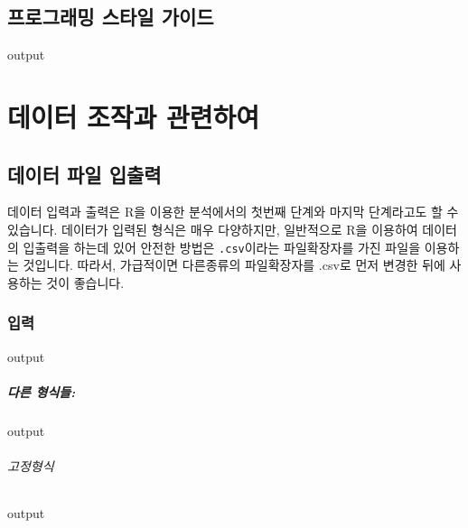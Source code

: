 \documentclass{book}
\begin{document}
	
\section{프로그래밍 스타일 가이드}
\begin{Schunk}
\begin{Soutput}
output
\end{Soutput}
\end{Schunk}

%
%
%

\chapter{데이터 조작과 관련하여}

\section{데이터 파일 입출력}

데이터 입력과 출력은 R을 이용한 분석에서의 첫번째 단계와 마지막 단계라고도 할 수 있습니다. 
데이터가 입력된 형식은 매우 다양하지만,  일반적으로 R을 이용하여 데이터의 입출력을 하는데 있어 안전한 방법은 \texttt{.csv}이라는 파일확장자를 가진 파일을 이용하는 것입니다.
따라서, 가급적이면 다른종류의 파일확장자를 .csv로 먼저 변경한 뒤에 사용하는 것이 좋습니다. 

\subsection{입력}
\begin{Schunk}
\begin{Soutput}
output
\end{Soutput}
\end{Schunk}

\paragraph{다른 형식들: }
\begin{Schunk}
\begin{Soutput}
output
\end{Soutput}
\end{Schunk}

\subparagraph{고정형식}
\begin{Schunk}
\begin{Soutput}
output
\end{Soutput}
\end{Schunk}
\end{document}
